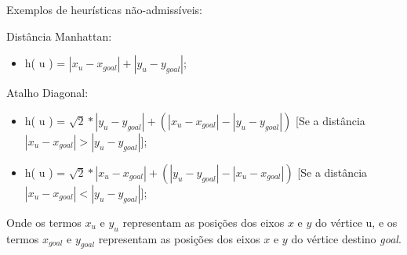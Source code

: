 Exemplos de heurísticas não-admissíveis:
\begin{description}
\item[Distância Manhattan:]
\end{description}
\begin{itemize}
\item h( u ) = $| x_{u} - x_{goal} | + | y_{u} - y_{goal}|$;
\end{itemize}
\begin{description}
\item[Atalho Diagonal:]
\end{description}
\begin{itemize}
\item h( u ) = $\sqrt{2} * | y_{u} - y_{goal}| + ( | x_{u} - x_{goal} | - | y_{u} - y_{goal}| )$ [Se a distância $| x_{u} - x_{goal} | > | y_{u} - y_{goal}|$];
\item h( u ) = $\sqrt{2} * | x_{u} - x_{goal}| + ( | y_{u} - y_{goal}| - | x_{u} - x_{goal} | )$ [Se a distância $| x_{u} - x_{goal} | < | y_{u} - y_{goal}|$];
\end{itemize}

Onde os termos $x_{u}$ e $y_{u}$ representam as posições dos eixos $x$ e $y$ do vértice u, e os termos $x_{goal}$ e $y_{goal}$ representam as posições dos eixos $x$ e $y$ do vértice destino \textit{goal}.



